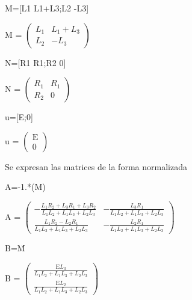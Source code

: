 \documentclass[10pt,a4paper]{article} %
\begin{document}
	\begin{matlabcode}
		M=[L1 L1+L3;L2 -L3]
	\end{matlabcode}
	\begin{matlabsymbolicoutput}
		M = 
		$\displaystyle \left(\begin{array}{cc}
		L_1  & L_1 +L_3 \\
		L_2  & -L_3 
		\end{array}\right)$
	\end{matlabsymbolicoutput}
	\begin{matlabcode}
		N=[R1 R1;R2 0]
	\end{matlabcode}
	\begin{matlabsymbolicoutput}
		N = 
		$\displaystyle \left(\begin{array}{cc}
		R_1  & R_1 \\
		R_2  & 0
		\end{array}\right)$
	\end{matlabsymbolicoutput}
	\begin{matlabcode}
		u=[E;0]
	\end{matlabcode}
	\begin{matlabsymbolicoutput}
		u = 
		$\displaystyle \left(\begin{array}{c}
		\textrm{E}\\
		0
		\end{array}\right)$
	\end{matlabsymbolicoutput}
	
	\begin{par}
		\begin{flushleft}
			Se expresan las matrices de la forma normalizada
		\end{flushleft}
	\end{par}
	
	\vspace{1em}
	
	\begin{matlabcode}
		A=-1.*(M\N)
	\end{matlabcode}
	\begin{matlabsymbolicoutput}
		A = 
		$\displaystyle \left(\begin{array}{cc}
		-\frac{L_1  R_2 +L_3  R_1 +L_3  R_2 }{L_1  L_2 +L_1  L_3 +L_2  L_3 } & -\frac{L_3  R_1 }{L_1  L_2 +L_1  L_3 +L_2  L_3 }\\
		\frac{L_1  R_2 -L_2  R_1 }{L_1  L_2 +L_1  L_3 +L_2  L_3 } & -\frac{L_2  R_1 }{L_1  L_2 +L_1  L_3 +L_2  L_3 }
		\end{array}\right)$
	\end{matlabsymbolicoutput}
	\begin{matlabcode}
		
		B=M\u
	\end{matlabcode}
	\begin{matlabsymbolicoutput}
		B = 
		$\displaystyle \left(\begin{array}{c}
		\frac{\textrm{E} L_3 }{L_1  L_2 +L_1  L_3 +L_2  L_3 }\\
		\frac{\textrm{E} L_2 }{L_1  L_2 +L_1  L_3 +L_2  L_3 }
		\end{array}\right)$
	\end{matlabsymbolicoutput}
	
\end{document}
